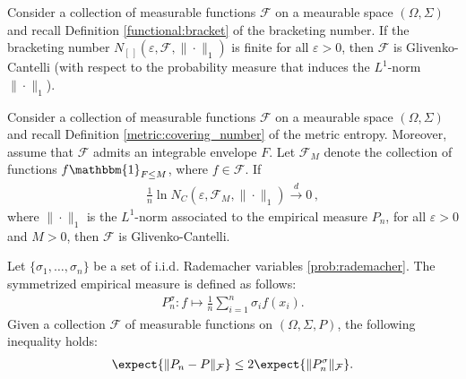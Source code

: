     \begin{property}
        Consider a collection of measurable functions $\mathcal{F}$ on a meaurable space $(\Omega,\Sigma)$ and recall Definition \ref{functional:bracket} of the bracketing number. If the bracketing number $N_{[\,]}(\varepsilon,\mathcal{F},\|\cdot\|_1)$ is finite for all $\varepsilon>0$, then $\mathcal{F}$ is Glivenko-Cantelli (with respect to the probability measure that induces the $L^1$-norm $\|\cdot\|_1$).
    \end{property}
    \begin{property}\label{statistics:entrop_GC}
        Consider a collection of measurable functions $\mathcal{F}$ on a meaurable space $(\Omega,\Sigma)$ and recall Definition \ref{metric:covering_number} of the metric entropy. Moreover, assume that $\mathcal{F}$ admits an integrable envelope $F$. Let $\mathcal{F}_M$ denote the collection of functions $f\mathbbm{1}_{F\leq M}$, where $f\in\mathcal{F}$. If
        \begin{gather}
            \frac{1}{n}\ln N_C(\varepsilon,\mathcal{F}_M,\|\cdot\|_1)\overset{d}{\longrightarrow}0\,,
        \end{gather}
        where $\|\cdot\|_1$ is the $L^1$-norm associated to the empirical measure $P_n$, for all $\varepsilon>0$ and $M>0$, then $\mathcal{F}$ is Glivenko-Cantelli.
    \end{property}

    \begin{property}
        Let $\{\sigma_1,\ldots,\sigma_n\}$ be a set of i.i.d. Rademacher variables \ref{prob:rademacher}. The symmetrized empirical measure is defined as follows:
        \begin{gather}
            P^\sigma_n:f\mapsto\frac{1}{n}\sum_{i=1}^n\sigma_if(x_i).
        \end{gather}
        Given a collection $\mathcal{F}$ of measurable functions on $(\Omega,\Sigma,P)$, the following inequality holds:
        \begin{gather}
            \expect{\|P_n-P\|_\mathcal{F}}\leq2\expect{\|P^\sigma_n\|_\mathcal{F}}.
        \end{gather}
    \end{property}

